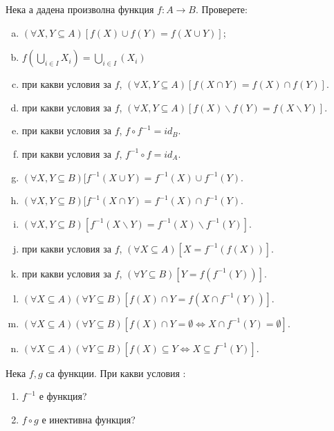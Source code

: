 

\begin{problem}
  Нека а дадена произволна функция $f:A \to B$.
  Проверете:
  \begin{enumerate}[a)]
  \item
    $(\forall X,Y \subseteq A)[f(X)\cup f(Y) = f(X\cup Y)]$;
  \item
    $f(\bigcup_{i\in I}X_i) = \bigcup_{i\in I}(X_i)$
  \item
    при какви условия за $f$,
    $(\forall X,Y \subseteq A)[f(X\cap Y) = f(X)\cap f(Y)]$.
  \item
    при какви условия за $f$,
    $(\forall X,Y \subseteq A)[f(X)\backslash f(Y) = f(X\backslash Y)]$.
  \item
    при какви условия за $f$, $f\circ f^{-1} = id_{B}$.
  \item
     при какви условия за $f$, $f^{-1}\circ f = id_{A}$.
  \item
    $(\forall X,Y \subseteq B)[f^{-1}(X\cup Y) = f^{-1}(X)\cup f^{-1}(Y)$.
  \item
    $(\forall X,Y \subseteq B)[f^{-1}(X\cap Y) = f^{-1}(X)\cap f^{-1}(Y)$.
  \item
    $(\forall X,Y \subseteq B)[f^{-1}(X\backslash Y) = f^{-1}(X)\backslash f^{-1}(Y)]$.
  \item
    при какви условия за $f$,
    $(\forall X\subseteq A)[X =  f^{-1}(f(X))]$.
  \item
    при какви условия за $f$,
    $(\forall Y \subseteq B)[Y = f(f^{-1}(Y))]$.
  \item
    $(\forall X\subseteq A)(\forall Y\subseteq B)[f(X)\cap Y = f(X\cap f^{-1}(Y))]$.
  \item
    $(\forall X \subseteq A)(\forall Y \subseteq B)[f(X)\cap Y = \emptyset \iff X\cap f^{-1}(Y) = \emptyset]$.
  \item
    $(\forall X \subseteq A)(\forall Y \subseteq B)[f(X)\subseteq Y \iff X\subseteq f^{-1}(Y)]$.
  \end{enumerate}
\end{problem}
\newpage
\begin{problem}%
  Нека $f,g$ са функции. При какви условия :
  \begin{enumerate}
  \item
    $f^{-1}$ е функция?
  \item
    $f\circ g$ е инективна функция?
  \end{enumerate}
\end{problem}


